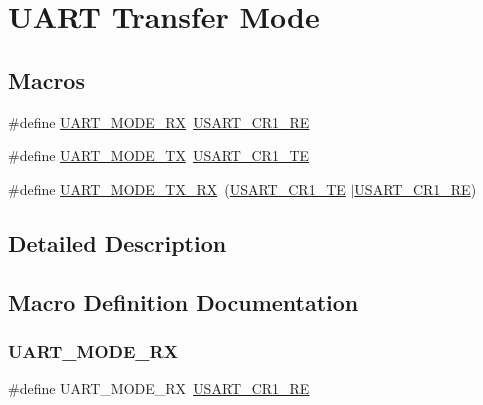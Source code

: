 \hypertarget{group___u_a_r_t___mode}{}\section{U\+A\+RT Transfer Mode}
\label{group___u_a_r_t___mode}
\subsection*{Macros}
\begin{DoxyCompactItemize}
\item 
\#define \mbox{\hyperlink{group___u_a_r_t___mode_ga6cdc4e35cd90d15a964994499475e7d7}{U\+A\+R\+T\+\_\+\+M\+O\+D\+E\+\_\+\+RX}}~\mbox{\hyperlink{group___peripheral___registers___bits___definition_gada0d5d407a22264de847bc1b40a17aeb}{U\+S\+A\+R\+T\+\_\+\+C\+R1\+\_\+\+RE}}
\item 
\#define \mbox{\hyperlink{group___u_a_r_t___mode_gad54f095a1073bcd81787d13fc268bd62}{U\+A\+R\+T\+\_\+\+M\+O\+D\+E\+\_\+\+TX}}~\mbox{\hyperlink{group___peripheral___registers___bits___definition_gade7f090b04fd78b755b43357ecaa9622}{U\+S\+A\+R\+T\+\_\+\+C\+R1\+\_\+\+TE}}
\item 
\#define \mbox{\hyperlink{group___u_a_r_t___mode_gab47c162935901e89322e2ce6700b6744}{U\+A\+R\+T\+\_\+\+M\+O\+D\+E\+\_\+\+T\+X\+\_\+\+RX}}~(\mbox{\hyperlink{group___peripheral___registers___bits___definition_gade7f090b04fd78b755b43357ecaa9622}{U\+S\+A\+R\+T\+\_\+\+C\+R1\+\_\+\+TE}} $\vert$\mbox{\hyperlink{group___peripheral___registers___bits___definition_gada0d5d407a22264de847bc1b40a17aeb}{U\+S\+A\+R\+T\+\_\+\+C\+R1\+\_\+\+RE}})
\end{DoxyCompactItemize}


\subsection{Detailed Description}


\subsection{Macro Definition Documentation}
\mbox{\label{group___u_a_r_t___mode_ga6cdc4e35cd90d15a964994499475e7d7}} 
\subsubsection{\texorpdfstring{UART\_MODE\_RX}{UART\_MODE\_RX}}
{\footnotesize\ttfamily \#define U\+A\+R\+T\+\_\+\+M\+O\+D\+E\+\_\+\+RX~\mbox{\hyperlink{group___peripheral___registers___bits___definition_gada0d5d407a22264de847bc1b40a17aeb}{U\+S\+A\+R\+T\+\_\+\+C\+R1\+\_\+\+RE}}}

